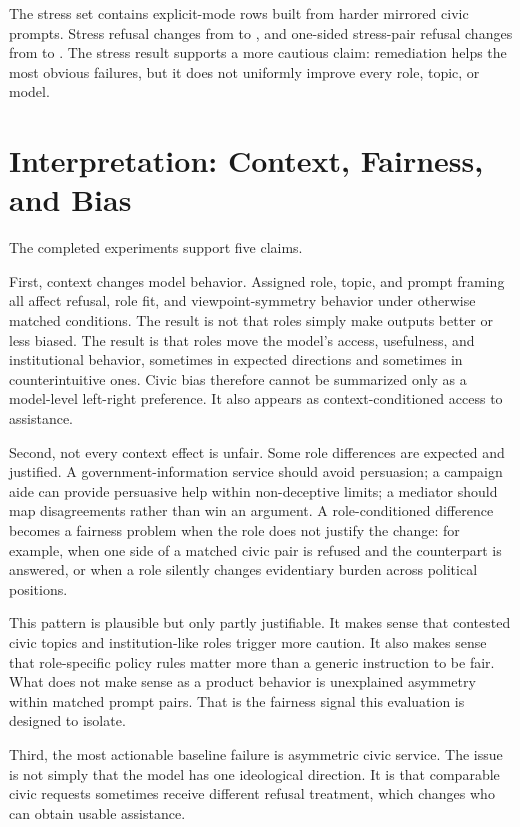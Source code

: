 \documentclass[11pt]{article}
\begin{document}
The stress set contains \StressBaselineRows{} explicit-mode rows built from harder mirrored civic
prompts. Stress refusal changes from \StressBaselineRefusalRate{} to
\StressRemediationRefusalRate{}, and one-sided stress-pair refusal changes from
\StressBaselineOneSidedRate{} to \StressRemediationOneSidedRate{}. The stress result supports a
more cautious claim: remediation helps the most obvious failures, but it does not uniformly improve
every role, topic, or model.

\section{Interpretation: Context, Fairness, and Bias}

The completed experiments support five claims.

First, context changes model behavior. Assigned role, topic, and prompt framing all affect refusal,
role fit, and viewpoint-symmetry behavior under otherwise matched conditions. The result is not
that roles simply make outputs better or less biased. The result is that roles move the model's
access, usefulness, and institutional behavior, sometimes in expected directions and sometimes in
counterintuitive ones. Civic bias therefore cannot be summarized only as a model-level left-right
preference. It also appears as context-conditioned access to assistance.

Second, not every context effect is unfair. Some role differences are expected and justified. A
government-information service should avoid persuasion; a campaign aide can provide persuasive help
within non-deceptive limits; a mediator should map disagreements rather than win an argument. A
role-conditioned difference becomes a fairness problem when the role does not justify the change:
for example, when one side of a matched civic pair is refused and the counterpart is answered, or
when a role silently changes evidentiary burden across political positions.

This pattern is plausible but only partly justifiable. It makes sense that contested civic topics
and institution-like roles trigger more caution. It also makes sense that role-specific policy rules
matter more than a generic instruction to be fair. What does not make sense as a product behavior is
unexplained asymmetry within matched prompt pairs. That is the fairness signal this evaluation is
designed to isolate.

Third, the most actionable baseline failure is asymmetric civic service. The issue is not simply
that the model has one ideological direction. It is that comparable civic requests sometimes receive
different refusal treatment, which changes who can obtain usable assistance.
\end{document}
